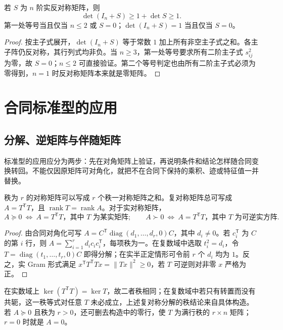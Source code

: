 \begin{corollary}
\label{cor:xie-ex-qf-skew-det}
若 $S$ 为 $n$ 阶实反对称矩阵，则
\[
 \det(I_n+S)\ge1+\det S\ge1.
\]
第一处等号当且仅当 $n\le2$ 或 $S=0$；$\det(I_n+S)=1$ 当且仅当 $S=0$。
\end{corollary}
\begin{proof}
按主子式展开，$\det(I_n+S)$ 等于常数 $1$ 加上所有非空主子式之和。各主子阵仍反对称，其行列式均非负。当 $n\ge3$，第一处等号要求所有二阶主子式 $s_{ij}^2$ 为零，故 $S=0$；$n\le2$ 可直接验证。第二个等号判定也由所有二阶主子式必须为零得到，$n=1$ 时反对称矩阵本来就是零矩阵。
\end{proof}

\section{合同标准型的应用}
\label{sec:xie-ex-qf-standard-applications}

\subsection{分解、逆矩阵与伴随矩阵}

标准型的应用应分为两步：先在对角矩阵上验证，再说明条件和结论怎样随合同变换转回。不能仅因原矩阵可对角化，就把不在合同下保持的乘积、迹或特征值一并替换。

\begin{proposition}
\label{prop:xie-ex-qf-gram}
秩为 $r$ 的对称矩阵可以写成 $r$ 个秩一对称矩阵之和。复对称矩阵总可写成 $A=T^{\mathsf T}T$，且 $\operatorname{rank}T=\operatorname{rank}A$。对于实对称矩阵，
\[
 A\succeq0\ \Longleftrightarrow\ A=T^{\mathsf T}T\text{，其中 $T$ 为某实矩阵};
 \qquad
 A\succ0\ \Longleftrightarrow\ A=T^{\mathsf T}T\text{，其中 $T$ 为可逆实方阵}.
\]
\end{proposition}
\begin{proof}
由合同对角化可写 $A=C^{\mathsf T}\operatorname{diag}(d_1,\ldots,d_r,0)C$，其中 $d_i\ne0$。若 $c_i^{\mathsf T}$ 为 $C$ 的第 $i$ 行，则 $A=\sum_{i=1}^r d_ic_ic_i^{\mathsf T}$，每项秩为一。在复数域中选取 $t_i^2=d_i$，令 $T=\operatorname{diag}(t_1,\ldots,t_r,0)C$ 即得分解；在实半正定情形可令前 $r$ 个 $d_i$ 均为 $1$。反之，实 Gram 形式满足 $x^{\mathsf T}T^{\mathsf T}Tx=\|Tx\|^2\ge0$，若 $T$ 可逆则对非零 $x$ 严格为正。
\end{proof}

在实数域上 $\ker(T^{\mathsf T}T)=\ker T$，故二者秩相同；在复数域中若只有转置而没有共轭，这一秩等式对任意 $T$ 未必成立，上述复对称分解的秩结论来自具体构造。若 $A\succeq0$ 且秩为 $r>0$，还可删去构造中的零行，使 $T$ 为满行秩的 $r\times n$ 矩阵；$r=0$ 时就是 $A=0$。

